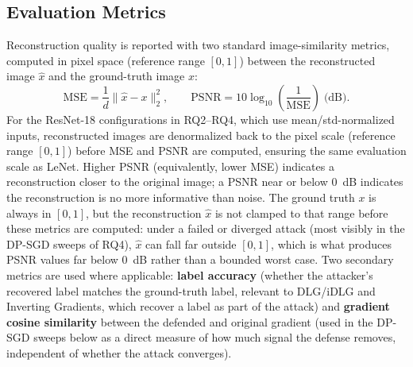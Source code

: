 \begin{table}[!htbp]
\centering
{}
\caption{Victim configurations evaluated. The LeNet row shared by DLG/iDLG and
Inverting Gradients uses identical architecture, initial weights, and image
(Section~\ref{sec:architectures}), giving RQ1 and RQ4 a matched-architecture
comparison point across the two attack families.}
\label{tab:eval-setup}
\end{table}

\FloatBarrier
\subsection{Evaluation Metrics}
\label{sec:eval-metrics}

Reconstruction quality is reported with two standard image-similarity metrics,
computed in pixel space (reference range $[0,1]$) between the reconstructed image $\hat{x}$ and
the ground-truth image $x$:
\begin{equation}
\mathrm{MSE} = \frac{1}{d}\lVert \hat{x} - x \rVert_2^2,
\qquad
\mathrm{PSNR} = 10 \log_{10}\!\left(\frac{1}{\mathrm{MSE}}\right) \; \text{(dB)}.
\label{eq:metrics}
\end{equation}
For the ResNet-18 configurations in RQ2--RQ4, which use mean/std-normalized inputs, reconstructed images are denormalized back to the pixel scale (reference range $[0,1]$) before MSE and PSNR are computed, ensuring the same evaluation scale as LeNet.
Higher PSNR (equivalently, lower MSE) indicates a reconstruction closer to the
original image; a PSNR near or below $0$~dB indicates the reconstruction is no more
informative than noise. The ground truth $x$ is always in $[0,1]$, but the
reconstruction $\hat{x}$ is not clamped to that range before these metrics are
computed: under a failed or diverged attack (most visibly in the DP-SGD sweeps of
RQ4), $\hat{x}$ can fall far outside $[0,1]$, which is what produces PSNR values far
below $0$~dB rather than a bounded worst case. Two secondary metrics are used where
applicable: \textbf{label
accuracy} (whether the attacker's recovered label matches the ground-truth label,
relevant to DLG/iDLG and Inverting Gradients, which recover a label as part of the
attack) and \textbf{gradient cosine similarity} between the defended and original
gradient (used in the DP-SGD sweeps below as a direct measure of how
much signal the defense removes, independent of whether the attack converges).

